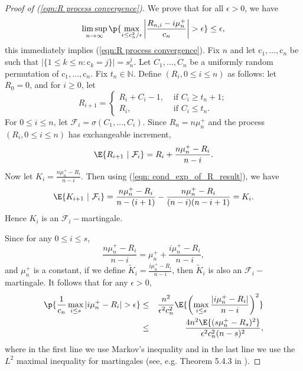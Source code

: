 \begin{proof}[Proof of (\ref{eqn:R process convergence})]
We prove that for all $\epsilon>0$, we have
\[\limsup\limits_{n\to\infty}\p{\max\limits_{i\le c^2_n/\epsilon}\left|\frac{R_{n,i}-i\mu^+_n}{c_n}\right|>\epsilon}\le \epsilon,\]
this immediately implies (\ref{eqn:R process convergence}).
Fix $n$ and let $\mathrm{c}_1, \ldots, \mathrm{c}_n$ be such that $|\{1\le k\le n: \mathrm{c}_k=j\}|=s^j_n$. Let $C_1, \ldots, C_n$ be a uniformly random permutation of $\mathrm{c}_1, \ldots, \mathrm{c}_n$. Fix $t_n\in\mathbb{N}$. Define $(R_i, 0\le i\le n)$ as follows: let $R_0=0$, and for $i\ge 0$, let
\[R_{i+1}=\left\{
                  \begin{array}{ll}
                    R_i+C_i-1, & \mbox{ if }C_i\ge t_n+1; \\
                    R_i, & \mbox{ if }C_i\le t_n.
                  \end{array}
                \right.\]
For $0\le i\le n$, let $\mathcal{F}_i=\sigma(C_1, \ldots, C_i)$. Since $R_n=n\mu^+_n$ and the process $(R_i, 0\le i\le n)$ has exchangeable increment,
\begin{equation}\label{eqn: cond_exp_of_R_result}
\E{R_{i+1}~|~\mathcal{F}_i}=R_i+\frac{n\mu^+_n-R_i}{n-i}.
\end{equation}
Now let $K_i=\frac{n\mu^+_n-R_i}{n-i}$. Then using (\ref{eqn: cond_exp_of_R_result}), we have \[\E{K_{i+1}~|~\mathcal{F}_i}=\frac{n\mu^+_n-R_i}{n-(i+1)}-\frac{n\mu^+_n-R_i}{(n-i)(n-i+1)}=K_i.\] Hence $K_i$ is an $\mathcal{F}_i-$martingale. 

Since for any $0\le i\le s$, \[\frac{n\mu^+_n-R_i}{n-i}=\mu^+_n+\frac{i\mu^+_n-R_i}{n-i},\] and $\mu^+_n$ is a constant, if we define $\tilde{K}_i=\frac{i\mu^+_n-R_i}{n-i}$, then $\tilde{K}_i$ is also an $\mathcal{F}_i-$martingale. 
It follows that for any $\epsilon>0$,
\begin{eqnarray}\label{eqn:prob bound on deviation of R}
\p{\frac{1}{c_n}\max\limits_{i\le s}|i\mu^+_n-R_i|>\epsilon}&\le& \frac{n^2}{\epsilon^2c^2_n}\E{\left(\max\limits_{i\le s}\frac{|i\mu^+_n-R_i|}{n-i}\right)^2}\nonumber\\
&\le& \frac{4n^2\E{(s\mu^+_n-R_s)^2}}{\epsilon^2c^2_n(n-s)^2},
\end{eqnarray}
where in the first line we use Markov's inequality and in the last line we use the $L^2$ maximal inequality for martingales (see, e.g. Theorem 5.4.3 in \cite{Durrett2010}). 


\end{proof}
